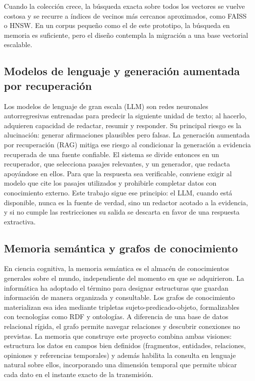 \documentclass[12pt,a4paper]{article}
\begin{document}
Cuando la colección crece, la búsqueda exacta sobre todos los vectores se vuelve costosa y se recurre a índices de vecinos más cercanos aproximados, como FAISS o HNSW. En un corpus pequeño como el de este prototipo, la búsqueda en memoria es suficiente, pero el diseño contempla la migración a una base vectorial escalable.

\subsection{Modelos de lenguaje y generación aumentada por recuperación}

Los modelos de lenguaje de gran escala (LLM) son redes neuronales autorregresivas entrenadas para predecir la siguiente unidad de texto; al hacerlo, adquieren capacidad de redactar, resumir y responder. Su principal riesgo es la alucinación: generar afirmaciones plausibles pero falsas. La generación aumentada por recuperación (RAG) mitiga ese riesgo al condicionar la generación a evidencia recuperada de una fuente confiable. El sistema se divide entonces en un recuperador, que selecciona pasajes relevantes, y un generador, que redacta apoyándose en ellos. Para que la respuesta sea verificable, conviene exigir al modelo que cite los pasajes utilizados y prohibirle completar datos con conocimiento externo. Este trabajo sigue ese principio: el LLM, cuando está disponible, nunca es la fuente de verdad, sino un redactor acotado a la evidencia, y si no cumple las restricciones su salida se descarta en favor de una respuesta extractiva.

\subsection{Memoria semántica y grafos de conocimiento}

En ciencia cognitiva, la memoria semántica es el almacén de conocimientos generales sobre el mundo, independiente del momento en que se adquirieron. La informática ha adoptado el término para designar estructuras que guardan información de manera organizada y consultable. Los grafos de conocimiento materializan esa idea mediante tripletas sujeto-predicado-objeto, formalizables con tecnologías como RDF y ontologías. A diferencia de una base de datos relacional rígida, el grafo permite navegar relaciones y descubrir conexiones no previstas. La memoria que construye este proyecto combina ambas visiones: estructura los datos en campos bien definidos (fragmentos, entidades, relaciones, opiniones y referencias temporales) y además habilita la consulta en lenguaje natural sobre ellos, incorporando una dimensión temporal que permite ubicar cada dato en el instante exacto de la transmisión.
\end{document}
